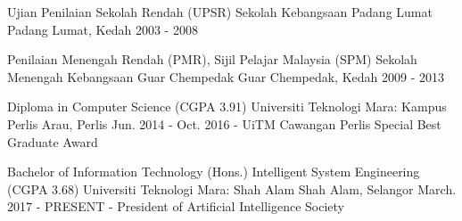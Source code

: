 

\begin{cventries}


\cventry
  {Ujian Penilaian Sekolah Rendah (UPSR)}
  {Sekolah Kebangsaan Padang Lumat}
  {Padang Lumat, Kedah}
  {2003 - 2008}
  {}

\cventry
  {Penilaian Menengah Rendah (PMR), Sijil Pelajar Malaysia (SPM)}
  {Sekolah Menengah Kebangsaan Guar Chempedak}
  {Guar Chempedak, Kedah}
  {2009 - 2013}
  {}

\cventry
  {Diploma in Computer Science (CGPA 3.91)}
  {Universiti Teknologi Mara: Kampus Perlis}
  {Arau, Perlis}
  {Jun. 2014 - Oct. 2016}
  {- UiTM Cawangan Perlis Special Best Graduate Award}

\hfill \break

\cventry
  {Bachelor of Information Technology (Hons.) Intelligent System Engineering (CGPA 3.68)}
  {Universiti Teknologi Mara: Shah Alam}
  {Shah Alam, Selangor}
  {March. 2017 - PRESENT}
  {- President of Artificial Intelligence Society}

\end{cventries}
